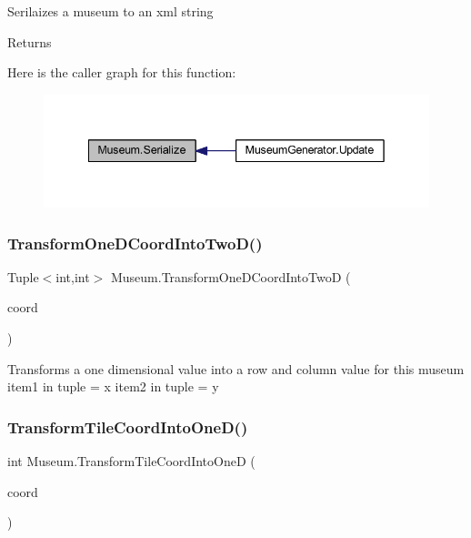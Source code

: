 Serilaizes a museum to an xml string 

\begin{DoxyReturn}{Returns}

\end{DoxyReturn}
Here is the caller graph for this function\+:
\nopagebreak
\begin{figure}[H]
\begin{center}
\leavevmode
\includegraphics[width=342pt]{class_museum_ac956bb7d7454f99944af157c79f695b8_icgraph}
\end{center}
\end{figure}
\mbox{\label{class_museum_a72e9020ee5d8406df0fc41fc4295727f}} 
\subsubsection{\texorpdfstring{Transform\+One\+D\+Coord\+Into\+Two\+D()}{TransformOneDCoordIntoTwoD()}}
{\footnotesize\ttfamily Tuple$<$int,int$>$ Museum.\+Transform\+One\+D\+Coord\+Into\+TwoD (\begin{DoxyParamCaption}\item[{int}]{coord }\end{DoxyParamCaption})\hspace{0.3cm}{\ttfamily [private]}}



Transforms a one dimensional value into a row and column value for this museum item1 in tuple = x item2 in tuple = y 

\mbox{\label{class_museum_a405e60db962417dde46d46180cbf81df}} 
\subsubsection{\texorpdfstring{Transform\+Tile\+Coord\+Into\+One\+D()}{TransformTileCoordIntoOneD()}}
{\footnotesize\ttfamily int Museum.\+Transform\+Tile\+Coord\+Into\+OneD (\begin{DoxyParamCaption}\item[{Vector2\+Int}]{coord }\end{DoxyParamCaption})\hspace{0.3cm}{\ttfamily [private]}}



